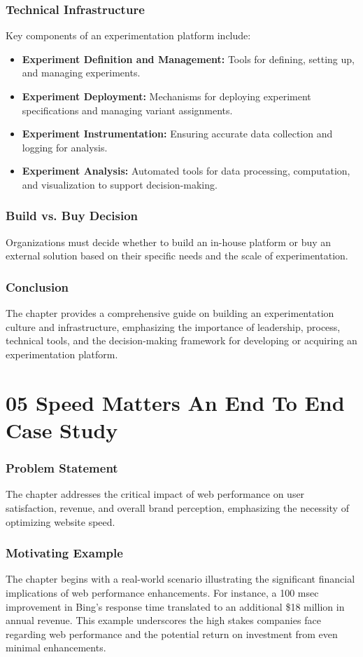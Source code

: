 \documentclass{article}
\begin{document}
\subsubsection*{Technical Infrastructure}
Key components of an experimentation platform include:
\begin{itemize}
    \item \textbf{Experiment Definition and Management:} Tools for defining, setting up, and managing experiments.
    \item \textbf{Experiment Deployment:} Mechanisms for deploying experiment specifications and managing variant assignments.
    \item \textbf{Experiment Instrumentation:} Ensuring accurate data collection and logging for analysis.
    \item \textbf{Experiment Analysis:} Automated tools for data processing, computation, and visualization to support decision-making.
\end{itemize}

\subsubsection*{Build vs. Buy Decision}
Organizations must decide whether to build an in-house platform or buy an external solution based on their specific needs and the scale of experimentation.

\subsubsection*{Conclusion}
The chapter provides a comprehensive guide on building an experimentation culture and infrastructure, emphasizing the importance of leadership, process, technical tools, and the decision-making framework for developing or acquiring an experimentation platform.

\section*{05 Speed Matters An End To End Case Study}
\subsubsection*{Problem Statement}
The chapter addresses the critical impact of web performance on user satisfaction, revenue, and overall brand perception, emphasizing the necessity of optimizing website speed.

\subsubsection*{Motivating Example}
The chapter begins with a real-world scenario illustrating the significant financial implications of web performance enhancements. For instance, a 100 msec improvement in Bing's response time translated to an additional \$18 million in annual revenue. This example underscores the high stakes companies face regarding web performance and the potential return on investment from even minimal enhancements.
\end{document}
